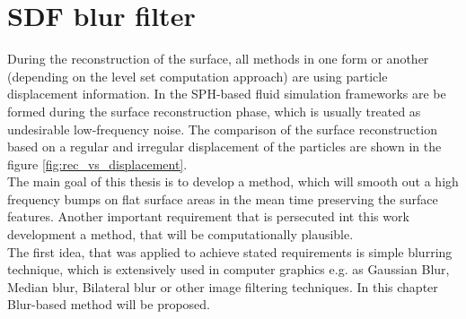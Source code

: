 \chapter{SDF blur filter} \label{sec:blur}
During the reconstruction of the surface, all methods in one form or another (depending on the level set computation approach) are using particle displacement information. In the SPH-based fluid simulation frameworks are be formed during the surface reconstruction phase, which is usually treated as undesirable low-frequency noise. The comparison of the surface reconstruction based on a regular and irregular displacement of the particles are shown in the figure \ref{fig:rec_vs_displacement}.\\
The main goal of this thesis is to develop a method, which will smooth out a high frequency bumps on flat surface areas in the mean time preserving the surface features. Another important requirement that is persecuted int this work development a method, that will be computationally plausible.\\
The first idea, that was applied to achieve stated requirements is simple blurring technique, which is extensively used in computer graphics e.g. as Gaussian Blur, Median blur, Bilateral blur or other image filtering techniques. In this chapter Blur-based method will be proposed. 
